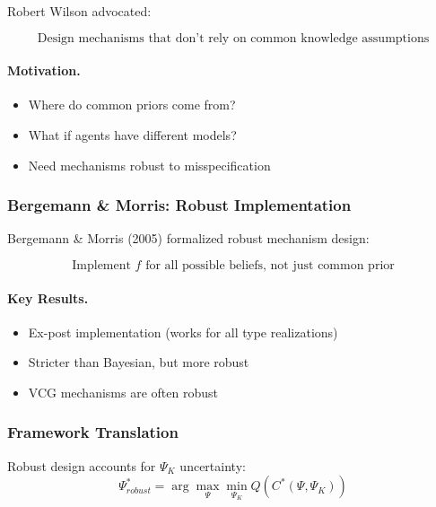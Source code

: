 Robert Wilson advocated:

\begin{equation}
\boxed{
\text{Design mechanisms that don't rely on common knowledge assumptions}
}
\label{eq:wilson}
\end{equation}

\paragraph{Motivation.}
\begin{itemize}
    \item Where do common priors come from?
    \item What if agents have different models?
    \item Need mechanisms robust to misspecification
\end{itemize}

\subsubsection{Bergemann \& Morris: Robust Implementation}

Bergemann \& Morris (2005) formalized robust mechanism design:

\begin{equation}
\boxed{
\text{Implement } f \text{ for all possible beliefs, not just common prior}
}
\label{eq:robust}
\end{equation}

\paragraph{Key Results.}
\begin{itemize}
    \item Ex-post implementation (works for all type realizations)
    \item Stricter than Bayesian, but more robust
    \item VCG mechanisms are often robust
\end{itemize}

\subsubsection{Framework Translation}

Robust design accounts for $\Psi_K$ uncertainty:
\begin{equation}
\Psi^*_{robust} = \arg\max_{\Psi} \min_{\Psi_K} Q(C^*(\Psi, \Psi_K))
\end{equation}


